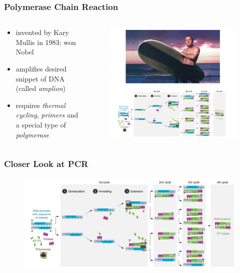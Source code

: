 \documentclass[
        11pt, %
]{beamer}
\begin{document}
\begin{frame}
    \frametitle{Polymerase Chain Reaction}
    \begin{columns}[c]
        \begin{column}{.4\textwidth}
        \begin{itemize}
            \item invented by Kary Mullis in 1983; won Nobel
            \item amplifies desired snippet of DNA (called \emph{amplion})
            \item requires \emph{thermal cycling}, \emph{primers} and a special type of \emph{polymerase}
        \end{itemize}
        \end{column}
        \begin{column}{.6\textwidth}
        \begin{figure}
            \includegraphics[width=\linewidth]{pcr.png}
        \end{figure}
        \end{column}
    \end{columns}
\end{frame}

\begin{frame}
    \frametitle{Closer Look at PCR}
        \begin{figure}
            \includegraphics[width=\linewidth]{pcrToo.png}
        \end{figure}
\end{frame}
\end{document}
